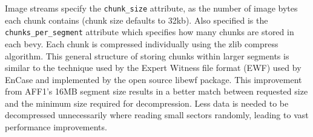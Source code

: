 \documentclass[10pt, conference]{IEEEtran}
\begin{document}
Image streams specify the \texttt{chunk\_size} attribute, as the
number of image bytes each chunk contains (chunk size defaults to
32kb). Also specified is the \texttt{chunks\_per\_segment} attribute
which specifies how many chunks are stored in each bevy. Each chunk is
compressed individually using the zlib compress algorithm. This
general structure of storing chunks within larger segments is similar
to the technique used by the Expert Witness file format (EWF) used by
EnCase\cite{encase-3.0} and implemented by the open source
libewf\cite{libewf} package. This improvement from AFF1's 16MB segment
size results in a better match between requested size and the minimum
size required for decompression. Less data is needed to be
decompressed unnecessarily where reading small sectors randomly,
leading to vast performance improvements.




\end{document}
